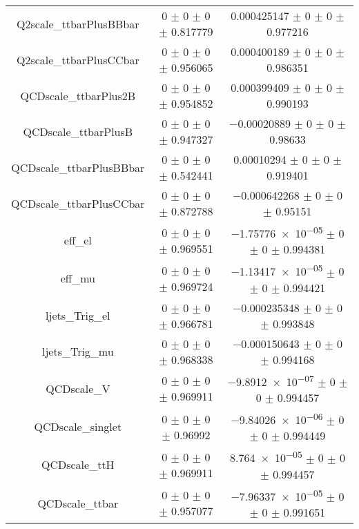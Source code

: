 \begin{table}
\begin{tabular}{ccc}
Q2scale\_ttbarPlusBBbar & \num{0} $\pm$ \num{0} $\pm$ \num{0} $\pm$ \num{0.817779} & \num{0.000425147} $\pm$ \num{0} $\pm$ \num{0} $\pm$ \num{0.977216}\\
Q2scale\_ttbarPlusCCbar & \num{0} $\pm$ \num{0} $\pm$ \num{0} $\pm$ \num{0.956065} & \num{0.000400189} $\pm$ \num{0} $\pm$ \num{0} $\pm$ \num{0.986351}\\
QCDscale\_ttbarPlus2B & \num{0} $\pm$ \num{0} $\pm$ \num{0} $\pm$ \num{0.954852} & \num{0.000399409} $\pm$ \num{0} $\pm$ \num{0} $\pm$ \num{0.990193}\\
QCDscale\_ttbarPlusB & \num{0} $\pm$ \num{0} $\pm$ \num{0} $\pm$ \num{0.947327} & \num{-0.00020889} $\pm$ \num{0} $\pm$ \num{0} $\pm$ \num{0.98633}\\
QCDscale\_ttbarPlusBBbar & \num{0} $\pm$ \num{0} $\pm$ \num{0} $\pm$ \num{0.542441} & \num{0.00010294} $\pm$ \num{0} $\pm$ \num{0} $\pm$ \num{0.919401}\\
QCDscale\_ttbarPlusCCbar & \num{0} $\pm$ \num{0} $\pm$ \num{0} $\pm$ \num{0.872788} & \num{-0.000642268} $\pm$ \num{0} $\pm$ \num{0} $\pm$ \num{0.95151}\\
eff\_el & \num{0} $\pm$ \num{0} $\pm$ \num{0} $\pm$ \num{0.969551} & \num{-1.75776e-05} $\pm$ \num{0} $\pm$ \num{0} $\pm$ \num{0.994381}\\
eff\_mu & \num{0} $\pm$ \num{0} $\pm$ \num{0} $\pm$ \num{0.969724} & \num{-1.13417e-05} $\pm$ \num{0} $\pm$ \num{0} $\pm$ \num{0.994421}\\
ljets\_Trig\_el & \num{0} $\pm$ \num{0} $\pm$ \num{0} $\pm$ \num{0.966781} & \num{-0.000235348} $\pm$ \num{0} $\pm$ \num{0} $\pm$ \num{0.993848}\\
ljets\_Trig\_mu & \num{0} $\pm$ \num{0} $\pm$ \num{0} $\pm$ \num{0.968338} & \num{-0.000150643} $\pm$ \num{0} $\pm$ \num{0} $\pm$ \num{0.994168}\\
QCDscale\_V & \num{0} $\pm$ \num{0} $\pm$ \num{0} $\pm$ \num{0.969911} & \num{-9.8912e-07} $\pm$ \num{0} $\pm$ \num{0} $\pm$ \num{0.994457}\\
QCDscale\_singlet & \num{0} $\pm$ \num{0} $\pm$ \num{0} $\pm$ \num{0.96992} & \num{-9.84026e-06} $\pm$ \num{0} $\pm$ \num{0} $\pm$ \num{0.994449}\\
QCDscale\_ttH & \num{0} $\pm$ \num{0} $\pm$ \num{0} $\pm$ \num{0.969911} & \num{8.764e-05} $\pm$ \num{0} $\pm$ \num{0} $\pm$ \num{0.994457}\\
QCDscale\_ttbar & \num{0} $\pm$ \num{0} $\pm$ \num{0} $\pm$ \num{0.957077} & \num{-7.96337e-05} $\pm$ \num{0} $\pm$ \num{0} $\pm$ \num{0.991651}\\

\end{tabular}
\end{table}
